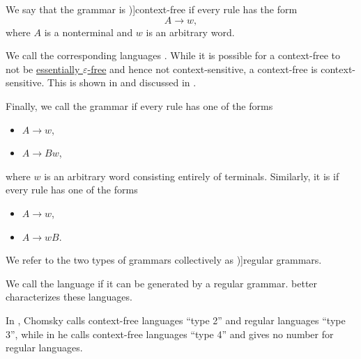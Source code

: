 \begin{definition}
\begin{thmenum}
     We say that the grammar is \term[ru=безконтекстная / контекстно-свободная (грамматика) (\cite[29]{Гладкий1973Языки})]{context-free} if every rule has the form
    \begin{equation*}
      A \to w,
    \end{equation*}
    where \( A \) is a nonterminal and \( w \) is an arbitrary word.

    We call the corresponding languages . While it is possible for a context-free  to not be \hyperref[def:epsilon_free_grammar]{essentially \( \varepsilon \)-free} and hence not context-sensitive, a context-free  is context-sensitive. This is shown in  and discussed in .

     Finally, we call the grammar  if every rule has one of the forms
    \begin{itemize}
      \item \( A \to w \),
      \item \( A \to B w \),
    \end{itemize}
    where \( w \) is an arbitrary word consisting entirely of terminals. Similarly, it is  if every rule has one of the forms
    \begin{itemize}
      \item \( A \to w \),
      \item \( A \to w B \).
    \end{itemize}

    We refer to the two types of grammars collectively as \term[ru=автоматная (грамматика) (\cite[29]{Гладкий1973Языки})]{regular grammars}.

    We call the language  if it can be generated by a regular grammar.  better characterizes these languages.
  \end{thmenum}
\end{definition}
\begin{comments}
  \item In \cite[142]{Chomsky1959}, Chomsky calls context-free languages \enquote{type 2} and regular languages \enquote{type 3}, while in \cite[366]{MathPsychology1963Vol2} he calls context-free languages \enquote{type 4} and gives no number for regular languages.
\end{comments}


